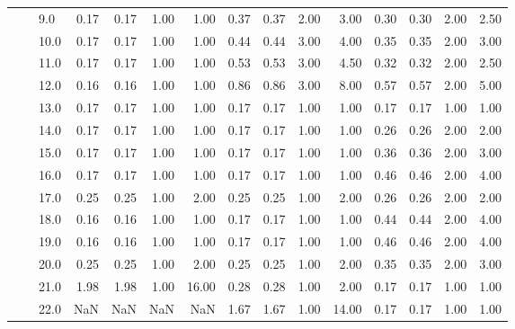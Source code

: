 \begin{tabular}{lllrrrrrrrrrrrr}
       &     & 9.0  &       0.17 &      0.17 & 1.00 &   1.00 &       0.37 &      0.37 &  2.00 &   3.00 &       0.30 &      0.30 &  2.00 &   2.50 \\
       &     & 10.0 &       0.17 &      0.17 & 1.00 &   1.00 &       0.44 &      0.44 &  3.00 &   4.00 &       0.35 &      0.35 &  2.00 &   3.00 \\
       &     & 11.0 &       0.17 &      0.17 & 1.00 &   1.00 &       0.53 &      0.53 &  3.00 &   4.50 &       0.32 &      0.32 &  2.00 &   2.50 \\
       &     & 12.0 &       0.16 &      0.16 & 1.00 &   1.00 &       0.86 &      0.86 &  3.00 &   8.00 &       0.57 &      0.57 &  2.00 &   5.00 \\
       &     & 13.0 &       0.17 &      0.17 & 1.00 &   1.00 &       0.17 &      0.17 &  1.00 &   1.00 &       0.17 &      0.17 &  1.00 &   1.00 \\
       &     & 14.0 &       0.17 &      0.17 & 1.00 &   1.00 &       0.17 &      0.17 &  1.00 &   1.00 &       0.26 &      0.26 &  2.00 &   2.00 \\
       &     & 15.0 &       0.17 &      0.17 & 1.00 &   1.00 &       0.17 &      0.17 &  1.00 &   1.00 &       0.36 &      0.36 &  2.00 &   3.00 \\
       &     & 16.0 &       0.17 &      0.17 & 1.00 &   1.00 &       0.17 &      0.17 &  1.00 &   1.00 &       0.46 &      0.46 &  2.00 &   4.00 \\
       &     & 17.0 &       0.25 &      0.25 & 1.00 &   2.00 &       0.25 &      0.25 &  1.00 &   2.00 &       0.26 &      0.26 &  2.00 &   2.00 \\
       &     & 18.0 &       0.16 &      0.16 & 1.00 &   1.00 &       0.17 &      0.17 &  1.00 &   1.00 &       0.44 &      0.44 &  2.00 &   4.00 \\
       &     & 19.0 &       0.16 &      0.16 & 1.00 &   1.00 &       0.17 &      0.17 &  1.00 &   1.00 &       0.46 &      0.46 &  2.00 &   4.00 \\
       &     & 20.0 &       0.25 &      0.25 & 1.00 &   2.00 &       0.25 &      0.25 &  1.00 &   2.00 &       0.35 &      0.35 &  2.00 &   3.00 \\
       &     & 21.0 &       1.98 &      1.98 & 1.00 &  16.00 &       0.28 &      0.28 &  1.00 &   2.00 &       0.17 &      0.17 &  1.00 &   1.00 \\
       &     & 22.0 &        NaN &       NaN &  NaN &    NaN &       1.67 &      1.67 &  1.00 &  14.00 &       0.17 &      0.17 &  1.00 &   1.00 \\

\end{tabular}
